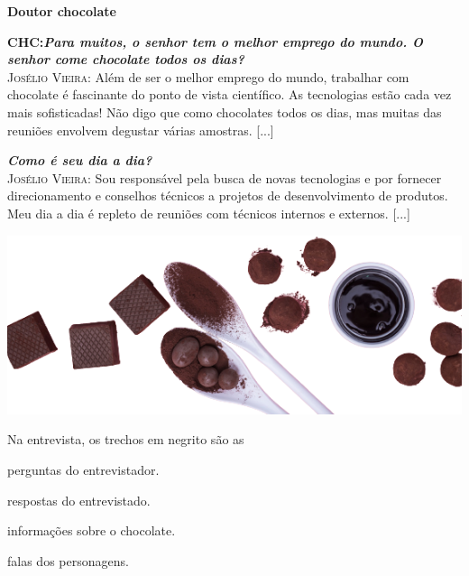 \begin{myquote}
\textbf{Doutor chocolate}

\textbf{CHC:\emph{Para muitos, o senhor tem o melhor emprego do mundo.
O senhor come chocolate todos os dias?}}\\
\textsc{Josélio Vieira}: Além de ser o melhor emprego do mundo, trabalhar com
chocolate é fascinante do ponto de vista científico. As tecnologias
estão cada vez mais sofisticadas! Não digo que como chocolates todos os
dias, mas muitas das reuniões envolvem degustar várias amostras.
{[}...{]}

\emph{\textbf{Como é seu dia a dia?}}\\
\textsc{Josélio Vieira}: Sou responsável pela busca de novas tecnologias e por fornecer
direcionamento e conselhos técnicos a projetos de desenvolvimento de
produtos. Meu dia a dia é repleto de reuniões com técnicos internos e
externos. {[}...{]}


\begin{center}
\includegraphics[width=\textwidth]{./media/image23k.png}
\end{center}


\end{myquote}

Na entrevista, os trechos em negrito são as

\begin{escolha}
\item perguntas do entrevistador.

\item respostas do entrevistado.

\item informações sobre o chocolate.

\item falas dos personagens.
\end{escolha}

